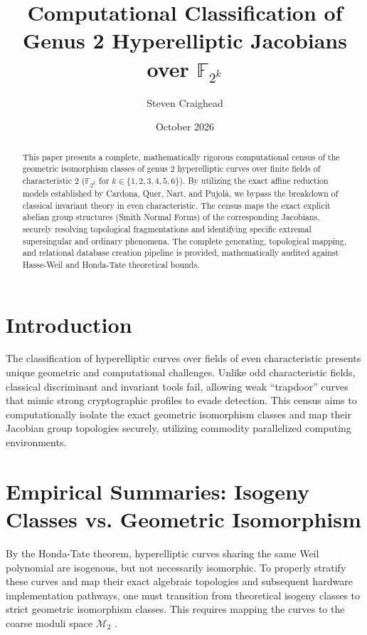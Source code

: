 \documentclass[11pt,letterpaper]{article}
\title{Computational Classification of Genus 2 Hyperelliptic Jacobians over $\mathbb{F}_{2^k}$}
\author{Steven Craighead}
\date{October 2026}
\begin{document}
	
	\maketitle
	
	\begin{abstract}
		This paper presents a complete, mathematically rigorous computational census of the geometric isomorphism classes of genus 2 hyperelliptic curves over finite fields of characteristic 2 ($\mathbb{F}_{2^k}$ for $k \in \{1, 2, 3, 4, 5, 6\}$). By utilizing the exact affine reduction models established by Cardona, Quer, Nart, and Pujolà, we bypass the breakdown of classical invariant theory in even characteristic. The census maps the exact explicit abelian group structures (Smith Normal Forms) of the corresponding Jacobians, securely resolving topological fragmentations and identifying specific extremal supersingular and ordinary phenomena. The complete generating, topological mapping, and relational database creation pipeline is provided, mathematically audited against Hasse-Weil and Honda-Tate theoretical bounds.
	\end{abstract}
	
	\section{Introduction}
	The classification of hyperelliptic curves over fields of even characteristic presents unique geometric and computational challenges. Unlike odd characteristic fields, classical discriminant and invariant tools fail, allowing weak ``trapdoor'' curves that mimic strong cryptographic profiles to evade detection. This census aims to computationally isolate the exact geometric isomorphism classes and map their Jacobian group topologies securely, utilizing commodity parallelized computing environments.
	
	\section{Empirical Summaries: Isogeny Classes vs. Geometric Isomorphism}
	By the Honda-Tate theorem, hyperelliptic curves sharing the same Weil polynomial are isogenous, but not necessarily isomorphic. To properly stratify these curves and map their exact algebraic topologies and subsequent hardware implementation pathways, one must transition from theoretical isogeny classes to strict geometric isomorphism classes. This requires mapping the curves to the coarse moduli space $\mathcal{M}_2$ \cite{Igusa1960, Zobernig2021}.
	
\end{document}

